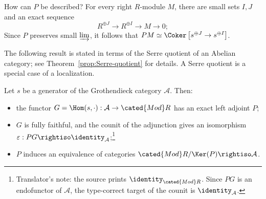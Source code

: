 How can $P$ be described? For every right $R$-module $M$, there are small sets $I,J$ and an exact sequence
\[ R^{\oplus J} \to R^{\oplus I} \to M \to 0; \]
Since $P$ preserves small $\varinjlim$, it follows that
$PM\simeq\Coker\left[s^{\oplus J}\to s^{\oplus I}\right]$.

The following result is stated in terms of the Serre quotient of an Abelian category; see Theorem~\ref{prop:Serre-quotient} for details. A Serre quotient is a special case of a localization.

\begin{theorem}\label{prop:GP}
	Let $s$ be a generator of the Grothendieck category $\mathcal{A}$. Then:
	\begin{itemize}
		\item the functor $G=\Hom(s,\cdot):\mathcal{A}\to\cated{Mod}R$ has an exact left adjoint $P$;
		\item $G$ is fully faithful, and the counit of the adjunction gives an isomorphism $\varepsilon:PG\rightiso\identity_{\mathcal{A}}$;\footnote{Translator's note: the source prints $\identity_{\cated{Mod}R}$. Since $PG$ is an endofunctor of $\mathcal{A}$, the type-correct target of the counit is $\identity_{\mathcal{A}}$.}
		\item $P$ induces an equivalence of categories $\cated{Mod}R/\Ker(P)\rightiso\mathcal{A}$.
	\end{itemize}
\end{theorem}
